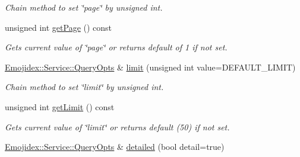 \begin{DoxyCompactItemize}
\begin{DoxyCompactList}\small\item\em Chain method to set \char`\"{}page\char`\"{} by unsigned int. \end{DoxyCompactList}\item 
unsigned int \hyperlink{classEmojidex_1_1Service_1_1QueryOpts_ab09d80f6810994e9f17eb69e0bf5bbd2}{get\+Page} () const 
\begin{DoxyCompactList}\small\item\em Gets current value of \char`\"{}page\char`\"{} or returns default of 1 if not set. \end{DoxyCompactList}\item 
\hyperlink{classEmojidex_1_1Service_1_1QueryOpts}{Emojidex\+::\+Service\+::\+Query\+Opts} \& \hyperlink{classEmojidex_1_1Service_1_1QueryOpts_a3a462f0647c4229aa24016c7e3fc24ea}{limit} (unsigned int value=D\+E\+F\+A\+U\+L\+T\+\_\+\+L\+I\+M\+IT)\hypertarget{classEmojidex_1_1Service_1_1QueryOpts_a3a462f0647c4229aa24016c7e3fc24ea}{}\label{classEmojidex_1_1Service_1_1QueryOpts_a3a462f0647c4229aa24016c7e3fc24ea}

\begin{DoxyCompactList}\small\item\em Chain method to set \char`\"{}limit\char`\"{} by unsigned int. \end{DoxyCompactList}\item 
unsigned int \hyperlink{classEmojidex_1_1Service_1_1QueryOpts_a1ad7569bc9fb0ab58ededdad2977e00f}{get\+Limit} () const 
\begin{DoxyCompactList}\small\item\em Gets current value of \char`\"{}limit\char`\"{} or returns default (50) if not set. \end{DoxyCompactList}\item 
\hyperlink{classEmojidex_1_1Service_1_1QueryOpts}{Emojidex\+::\+Service\+::\+Query\+Opts} \& \hyperlink{classEmojidex_1_1Service_1_1QueryOpts_a3cca92ff06d005a40e768ea9157721b6}{detailed} (bool detail=true)\hypertarget{classEmojidex_1_1Service_1_1QueryOpts_a3cca92ff06d005a40e768ea9157721b6}{}\label{classEmojidex_1_1Service_1_1QueryOpts_a3cca92ff06d005a40e768ea9157721b6}


\end{DoxyCompactItemize}
